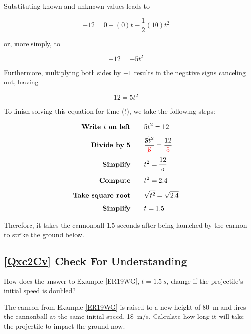 \documentclass[main-physics.tex]{subfiles}
\begin{document}
Substituting known and unknown values leads to

\begin{equation*}
    -12 = 0 + (0) t - \frac{1}{2} (10) t^2
\end{equation*}

or, more simply, to

\begin{equation*}
    -12 = -5 t^2
\end{equation*}

Furthermore, multiplying both sides by $-1$ results in the negative signs canceling out, leaving

\begin{equation*}
    12 = 5 t^2
\end{equation*}

To finish solving this equation for time ($t$), we take the following steps:

\begin{align*}
    \textbf{Write $t$ on left} \qquad & 5 t^2 = 12\\[1ex]
    \textbf{Divide by 5} \qquad & \frac{\cancel{5} t^2}{\textcolor{red}{\cancel{5}}} = \frac{12}{\textcolor{red}{5}}\\[1ex]
    \textbf{Simplify} \qquad & t^2 = \frac{12}{5}\\[1ex]
    \textbf{Compute} \qquad & t^2 = 2.4\\[1ex]
    \textbf{Take square root} \qquad & \sqrt{t^2} = \sqrt{2.4}\\[1ex]
    \textbf{Simplify} \qquad & t = 1.5
\end{align*}

Therefore, it takes the cannonball 1.5 seconds after being launched by the cannon to strike the ground below. 

\endsolution

\subsection*{\ref{Qxc2Cv} Check For Understanding}

\begin{exercise} \label{ADuHT8}
    How does the answer to Example \ref{ER19WG}, $t=\SI{1.5}{s}$, change if the projectile's initial speed is doubled?
\end{exercise}

\begin{exercise} \label{mT7mjd}
    The cannon from Example \ref{ER19WG} is raised to a new height of \SI{80}{m} and fires the cannonball at the same initial speed, \SI{18}{m/s}. Calculate how long it will take the projectile to impact the ground now.
\end{exercise}
\end{document}
